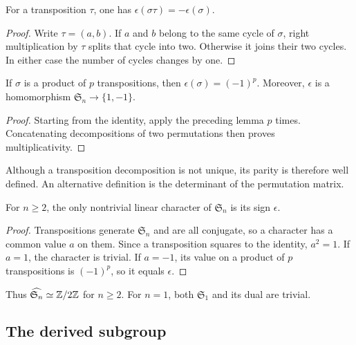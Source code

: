 
\begin{lem}
For a transposition $\tau$, one has $\epsilon(\sigma\tau)=-\epsilon(\sigma)$.
\end{lem}
\begin{proof}
Write $\tau=(a,b)$. If $a$ and $b$ belong to the same cycle of $\sigma$,
right multiplication by $\tau$ splits that cycle into two. Otherwise it joins
their two cycles. In either case the number of cycles changes by one.
\end{proof}


\begin{prop}
If $\sigma$ is a product of $p$ transpositions, then
$\epsilon(\sigma)=(-1)^p$. Moreover, $\epsilon$ is a homomorphism
$\mathfrak S_n\to\{1,-1\}$.
\end{prop}
\begin{proof}
Starting from the identity, apply the preceding lemma $p$ times.
Concatenating decompositions of two permutations then proves multiplicativity.
\end{proof}
Although a transposition decomposition is not unique, its parity is therefore
well defined. An alternative definition is the determinant of the permutation
matrix.


\begin{prop}
For $n\geq2$, the only nontrivial linear character of $\mathfrak S_n$ is its
sign $\epsilon$.
\end{prop}
\begin{proof}
Transpositions generate $\mathfrak S_n$ and are all conjugate, so a character
has a common value $a$ on them. Since a transposition squares to the identity,
$a^2=1$. If $a=1$, the character is trivial. If $a=-1$, its value on a product
of $p$ transpositions is $(-1)^p$, so it equals $\epsilon$.
\end{proof}
Thus $\widehat{\mathfrak S_n}\simeq\mathbb{Z}/2\mathbb{Z}$ for $n\geq2$. For $n=1$, both
$\mathfrak S_1$ and its dual are trivial.

\subsection{The derived subgroup}


